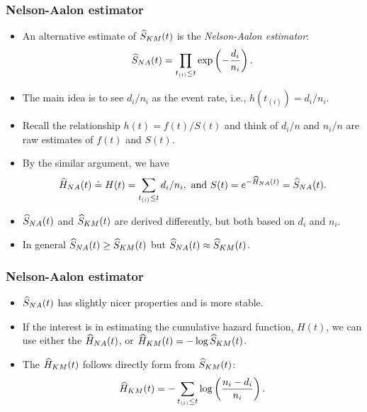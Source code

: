 \documentclass[10pt]{beamer}\usepackage[]{graphicx}\usepackage[]{color}
\newcommand{\empr}[1]{{\emph{\color{red}#1}}}
\newcommand{\Skm}{\widehat{S}_{\scriptsize{KM}}}
\newcommand{\Sna}{\widehat{S}_{\scriptsize{NA}}}
\newcommand{\Hkm}{\widehat{H}_{\scriptsize{KM}}}
\newcommand{\Hna}{\widehat{H}_{\scriptsize{NA}}}
\begin{document}
\begin{frame}
  \frametitle{Nelson-Aalon estimator}
  \begin{itemize}
  \item An alternative estimate of $\Skm(t)$ is the \empr{Nelson-Aalon estimator}:
    \begin{equation*}
      \Sna(t) = \prod_{t_{(i)} \le t} \exp\left(-\frac{d_i}{n_i}\right).
    \end{equation*}
  \item The main idea is to see $d_i/n_i$ as the event rate, i.e., $h(t_{(i)}) = d_i/n_i$.
  \item Recall the relationship $h(t) = f(t) / S(t)$ and think of $d_i/n$ and $n_i/n$ 
    are raw estimates of $f(t)$ and $S(t)$.
  \item By the similar argument, we have
    $$\Hna(t) \doteq H(t) = \sum_{t_{(i)} \le t} d_i/n_i, \mbox{ and } S(t) = e^{-\Hna(t)} = \Sna(t).$$
  \item $\Sna(t)$ and $\Skm(t)$ are derived differently, but both based on $d_i$ and $n_i$.
  \item In general $\Sna(t)\ge\Skm(t)$ but $\Sna(t)\approx\Skm(t)$.
  \end{itemize}
\end{frame}

\begin{frame}[fragile]
  \frametitle{Nelson-Aalon estimator}
  \begin{itemize}
  \item $\Sna(t)$ has slightly nicer properties and is more stable.
  \item If the interest is in estimating the cumulative hazard function, $H(t)$, 
    we can use either the $\Hna(t)$, or $\Hkm(t) = -\log\Skm(t)$.
  \item The $\Hkm(t)$ follows directly form from $\Skm(t)$:
    \begin{equation*}
      \Hkm(t) = - \sum_{t_{(i)}\le t}\log\left(\frac{n_i - d_i}{n_i}\right).
    \end{equation*}
  \end{itemize}
\end{frame}    
    
\end{document}
